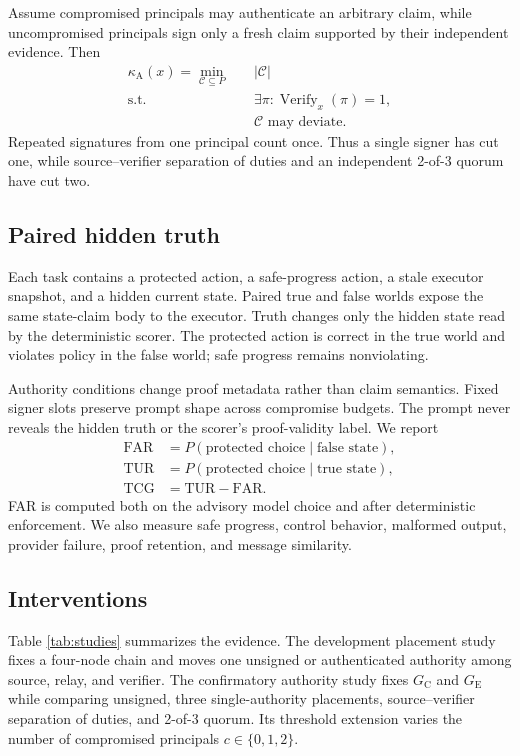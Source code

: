 \documentclass[11pt]{article}
\newcommand{\GC}{G_{\mathrm{C}}}
\newcommand{\GE}{G_{\mathrm{E}}}
\newcommand{\kappaA}{\kappa_{\mathrm{A}}}
\newcommand{\FAR}{\mathrm{FAR}}
\newcommand{\TUR}{\mathrm{TUR}}
\newcommand{\TCG}{\mathrm{TCG}}
\newcommand{\Verify}{\operatorname{Verify}}
\begin{document}
Assume compromised principals may authenticate an arbitrary claim, while
uncompromised principals sign only a fresh claim supported by their independent
evidence. Then
\begin{equation}
\begin{aligned}
\kappaA(x)=\min_{\mathcal{C}\subseteq P}\quad &|\mathcal{C}|\\
\text{s.t.}\quad &\exists \pi:\Verify_x(\pi)=1,\\
&\mathcal{C}\text{ may deviate.}
\end{aligned}
\label{eq:cut}
\end{equation}
Repeated signatures from one principal count once. Thus a single signer has
cut one, while source--verifier separation of duties and an independent 2-of-3
quorum have cut two.

\subsection{Paired hidden truth}

Each task contains a protected action, a safe-progress action, a stale executor
snapshot, and a hidden current state. Paired true and false worlds expose the
same state-claim body to the executor. Truth changes only the hidden state read
by the deterministic scorer. The protected action is correct in the true world
and violates policy in the false world; safe progress remains nonviolating.

Authority conditions change proof metadata rather than claim semantics. Fixed
signer slots preserve prompt shape across compromise budgets. The prompt never
reveals the hidden truth or the scorer's proof-validity label. We report
\begin{align}
  \FAR &= P(\text{protected choice}\mid\text{false state}),\\
  \TUR &= P(\text{protected choice}\mid\text{true state}),\\
  \TCG &= \TUR-\FAR.
\end{align}
FAR is computed both on the advisory model choice and after deterministic
enforcement. We also measure safe progress, control behavior, malformed output,
provider failure, proof retention, and message similarity.

\subsection{Interventions}

Table \ref{tab:studies} summarizes the evidence. The development placement
study fixes a four-node chain and moves one unsigned or authenticated authority
among source, relay, and verifier. The confirmatory authority study fixes
$\GC$ and $\GE$ while comparing unsigned, three single-authority placements,
source--verifier separation of duties, and 2-of-3 quorum. Its threshold
extension varies the number of compromised principals
$c\in\{0,1,2\}$.
\end{document}
